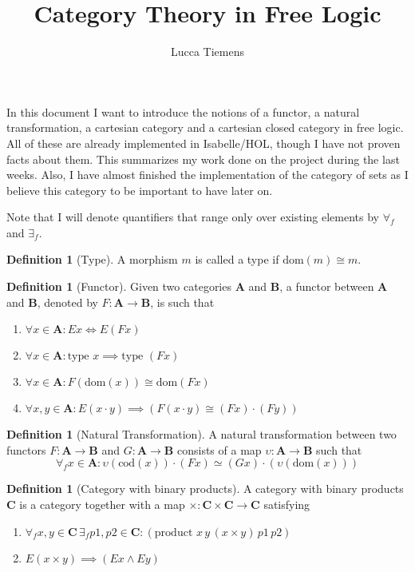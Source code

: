 \documentclass[a4paper, 11pt]{article}
\title{Category Theory in Free Logic}
\author{Lucca Tiemens}
\theoremstyle{definition}
\newtheorem{definition}[theorem]{Definition}
\newcommand{\cat}{%
	\mathbf %
}
\newcommand{\domain}[ 1 ]{%
	\mathrm{dom}(#1)%
}
\newcommand{\codomain}[ 1 ]{%
	\mathrm{cod}(#1)%
}
\begin{document}
\maketitle

In this document I want to introduce the notions of a functor, a natural transformation, a cartesian category and a cartesian closed category in free logic. All of these are already implemented in Isabelle/HOL, though I have not proven facts about them. This summarizes my work done on the project during the last weeks. Also, I have almost finished the implementation of the category of sets as I believe this category to be important to have later on.

Note that I will denote quantifiers that range only over existing elements by $\forall_f$ and $\exists_f$.

\begin{definition}[Type]
	A morphism $m$ is called a type if $\domain{m} \cong m$. 
\end{definition}

\begin{definition}[Functor]
	Given two categories $\cat A$ and $\cat B$, a functor between $\cat A$ and $\cat B$, denoted by $F: \cat A \to \cat B$, is such that
	\begin{enumerate}
		\item $\forall x \in \cat A: E x \iff E (F x)$
		\item $\forall x \in \cat A: \text{type } x \implies \text{type } (F x)$
		\item $\forall x \in \cat A: F (\domain x) \cong \domain{F x}$
		\item $\forall x, y \in \cat A: E(x\cdot y) \implies (F (x\cdot y) \cong (F x) \cdot (F y))$
	\end{enumerate}
\end{definition}

\begin{definition}[Natural Transformation]
	A natural transformation between two functors $F: \cat A \to \cat B$ and $G: \cat A \to \cat B$ consists of a map $\upsilon: \cat A \to \cat B$ such that
	\[ \forall_f x \in \cat A: \upsilon (\codomain{x}) \cdot (F x) \simeq (G x) \cdot (\upsilon (\domain{x}))\]
\end{definition}

\begin{definition}[Category with binary products]
	A category with binary products $\cat C$ is a category together with a map $\times: \cat C \times \cat C \to \cat C$ satisfying
	\begin{enumerate}
		\item $\forall_f x, y \in \cat C \, \exists_f p1, p2 \in \cat C: (\text{product } x \, y \, (x \times y) \, p1 \, p2)$
		\item $E (x \times y) \implies (E x \wedge E y)$
	\end{enumerate} 
\end{definition}
\end{document}
